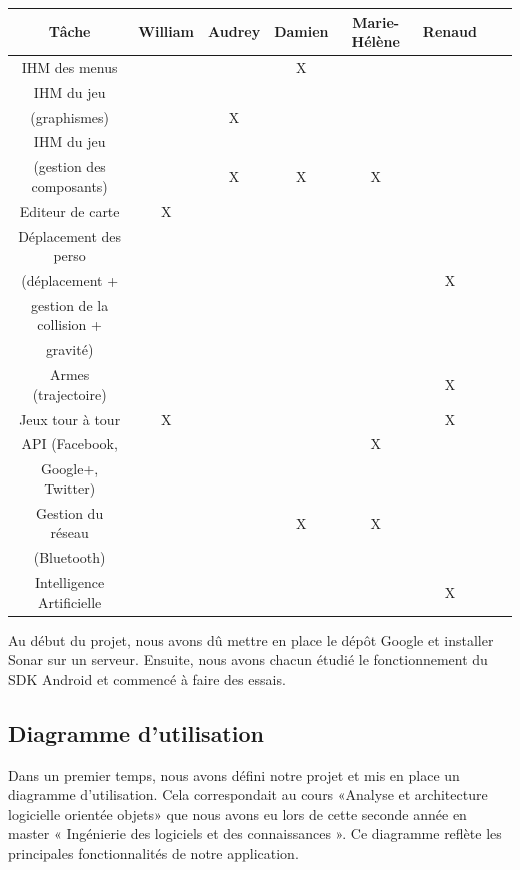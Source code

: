 \documentclass{report}
\begin{document}
\begin{tabular}{|c|c|c|c|c|c|c|c|}
\hline
{\bf Tâche } & {\bf William } & {\bf Audrey } & {\bf Damien } & {\bf Marie-Hélène } & {\bf Renaud }\\
\hline
{IHM des menus} & {} & {} & {X} & {} & {}\\
\hline
{IHM du jeu} & {} & {} & {} & {} & {} \\
{(graphismes)} & {} & {X} & {} & {} & {} \\
\hline
{IHM du jeu} & {} & {} & {} & {} & {}\\
{(gestion des composants)} & {} & {X} & {X} & {X} & {} \\
\hline
{Editeur de carte} & {X} & {} & {} & {} & {} \\
\hline
Déplacement des perso &&&&&\\
(déplacement + &&&&& X\\
gestion de la collision + &&&&&\\
 gravité) &&&&&\\
\hline
{Armes (trajectoire)} & {} & {} & {} & {} & {X} \\
\hline
{Jeux tour à tour} & {X} & {} & {} & {} & {X} \\
\hline
{API (Facebook,} & {} & {} & {} & {X} & {} \\
{ Google+, Twitter)} & {} & {} & {} & {} & {} \\
\hline
{Gestion du réseau} & {} & {} & {X} & {X} & {} \\
{(Bluetooth)} & {} & {} & {} & {} & {} \\
\hline
{Intelligence Artificielle} & {} & {} & {} & {} & {X}\\
\hline
\end{tabular}
\bigskip


Au début du projet, nous avons dû mettre en place le dépôt Google et installer Sonar sur un serveur. Ensuite, nous avons chacun étudié le fonctionnement du SDK Android et commencé à faire des essais.

\subsection{Diagramme d’utilisation}

Dans un premier temps, nous avons défini notre projet et mis en place un diagramme d’utilisation. Cela correspondait au cours «Analyse et architecture logicielle orientée objets» que nous avons eu lors de cette seconde année en master « Ingénierie des logiciels et des connaissances ». Ce diagramme reflète les principales fonctionnalités de notre application.
\end{document}

